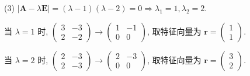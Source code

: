 \begin{solution}
  (3) $|\bm{A}-\lambda\bm{E}|=(\lambda-1)(\lambda-2)=0\Rightarrow\lambda_1=1,\lambda_2=2$.

  当 $\lambda=1$ 时, $\begin{pmatrix}3&-3\\2&-2\end{pmatrix}\to\begin{pmatrix}1&-1\\0&0\end{pmatrix}$, 
  取特征向量为 $\bm{r}=\begin{pmatrix}1\\1\end{pmatrix}$.

  当 $\lambda=2$ 时, $\begin{pmatrix}2&-3\\2&-3\end{pmatrix}\to\begin{pmatrix}2&-3\\0&0\end{pmatrix}$, 
  取特征向量为 $\bm{r}=\begin{pmatrix}3\\2\end{pmatrix}$.


\end{solution}
